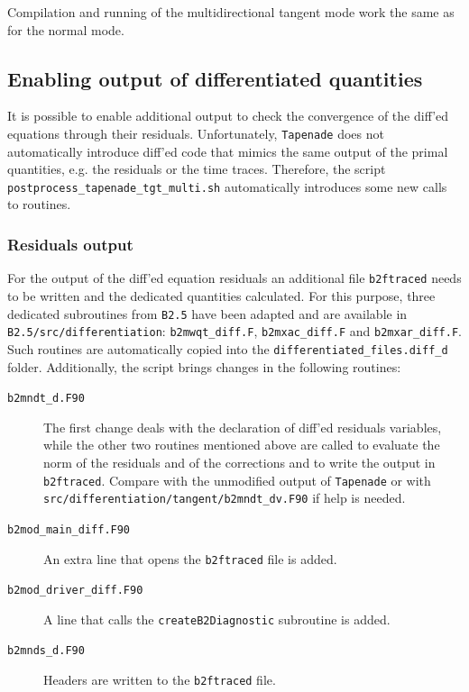 Compilation and running of the multidirectional tangent mode work the same as for the normal mode.

\subsection{Enabling output of differentiated quantities}\label{sed:diffout}

It is possible to enable additional output to check the convergence of the diff'ed equations through their residuals. Unfortunately, {\tt Tapenade} does not automatically introduce diff'ed code that mimics the same output of the primal quantities, e.g. the residuals or the time traces. Therefore, the script {\tt postprocess\_tapenade\_tgt\_multi.sh} automatically introduces some new calls to routines.

\subsubsection{Residuals output}

For the output of the diff'ed equation residuals an additional file {\tt b2ftraced} needs to be written and the dedicated quantities calculated. For this purpose, three dedicated subroutines from {\tt B2.5} have been adapted and are available in {\tt B2.5/src/differentiation}: {\tt b2mwqt\_diff.F}, {\tt b2mxac\_diff.F} and {\tt b2mxar\_diff.F}. Such routines are automatically copied into the {\tt differentiated\_files.diff\_d} folder. Additionally, the script brings changes in the following routines:
\begin{description}
  \item[\tt b2mndt\_d.F90] The first change deals with the declaration of diff'ed residuals variables, while the other two routines mentioned above are called to evaluate the norm of the residuals and of the corrections and to write the output in {\tt b2ftraced}. Compare with the unmodified output of {\tt Tapenade} or with {\tt src/differentiation/tangent/\allowbreak b2mndt\_dv.F90} if help is needed.

  \item[\tt b2mod\_main\_diff.F90] An extra line that opens the {\tt b2ftraced} file is added.

  \item[\tt b2mod\_driver\_diff.F90] A line that calls the {\tt createB2Diagnostic} subroutine is added.

  \item[\tt b2mnds\_d.F90] Headers are written to the {\tt b2ftraced} file.
\end{description}

